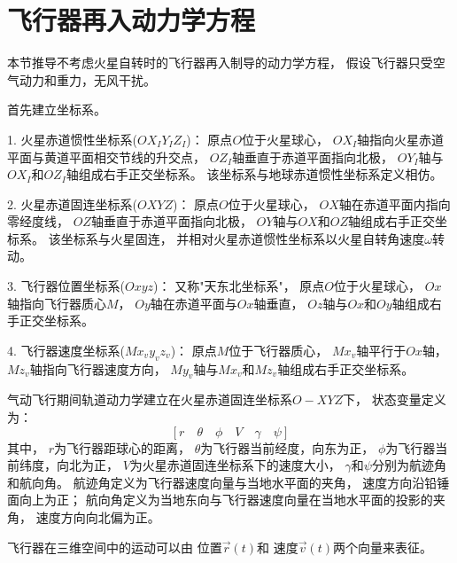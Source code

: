 \section{飞行器再入动力学方程}
本节推导不考虑火星自转时的飞行器再入制导的动力学方程，
假设飞行器只受空气动力和重力，无风干扰。

首先建立坐标系\cite{mdelong2006}。

1. 火星赤道惯性坐标系($OX_IY_IZ_I$)：
原点$O$位于火星球心，
$OX_I$轴指向火星赤道平面与黄道平面相交节线的升交点，
$OZ_I$轴垂直于赤道平面指向北极，
$OY_I$轴与$OX_I$和$OZ_I$轴组成右手正交坐标系。
该坐标系与地球赤道惯性坐标系定义相仿。

2. 火星赤道固连坐标系($OXYZ$)：
原点$O$位于火星球心，
$OX$轴在赤道平面内指向零经度线，
$OZ$轴垂直于赤道平面指向北极，
$OY$轴与$OX$和$OZ$轴组成右手正交坐标系。
该坐标系与火星固连，
并相对火星赤道惯性坐标系以火星自转角速度$\omega$转动。

3. 飞行器位置坐标系($Oxyz$)：
又称"天东北坐标系"，
原点$O$位于火星球心，
$Ox$轴指向飞行器质心$M$，
$Oy$轴在赤道平面与$Ox$轴垂直，
$Oz$轴与$Ox$和$Oy$轴组成右手正交坐标系。

4. 飞行器速度坐标系($Mx_vy_vz_v$)：
原点$M$位于飞行器质心，
$Mx_v$轴平行于$Ox$轴，
$Mz_v$轴指向飞行器速度方向，
$My_v$轴与$Mx_v$和$Mz_v$轴组成右手正交坐标系。

气动飞行期间轨道动力学建立在火星赤道固连坐标系$O-XYZ$下，
状态变量定义为：
\[[r\quad\theta\quad\phi\quad V\quad\gamma\quad\psi]\]
其中，
$r$为飞行器距球心的距离，
$\theta$为飞行器当前经度，向东为正，
$\phi$为飞行器当前纬度，向北为正，
$V$为火星赤道固连坐标系下的速度大小，
$\gamma$和$\psi$分别为航迹角和航向角。
航迹角定义为飞行器速度向量与当地水平面的夹角，
速度方向沿铅锤面向上为正；
航向角定义为当地东向与飞行器速度向量在当地水平面的投影的夹角，
速度方向向北偏为正。

飞行器在三维空间中的运动可以由
位置$\vec{r}(t)$和
速度$\vec{v}(t)$两个向量来表征。

